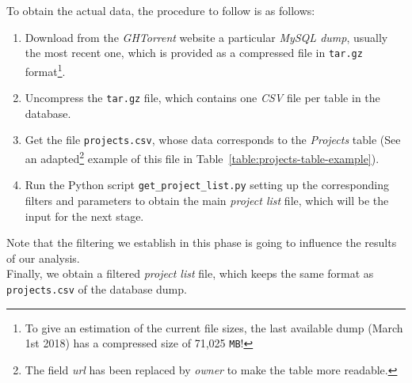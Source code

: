\documentclass[a4paper, 12pt]{book}
\begin{document}
To obtain the actual data, the procedure to follow is as follows:
\begin{enumerate}
  \item Download from the \emph{GHTorrent} website a particular \emph{MySQL dump}, usually the most recent one, which is provided as a compressed file in \texttt{tar.gz}
        format\footnote{To give an estimation of the current file sizes, the last available dump (March 1st 2018) has a compressed size of 71,025 \texttt{MB}!}.
  \item Uncompress the \texttt{tar.gz} file, which contains one \emph{CSV} file per table in the database.
  \item Get the file \texttt{projects.csv}, whose data corresponds to the \emph{Projects} table (See an adapted\footnote{The field \emph{url} has been replaced by \emph{owner} to make the table more readable.}
  example of this file in Table~\ref{table:projects-table-example}).
  \item Run the Python script \texttt{get\_project\_list.py} setting up the corresponding filters and parameters to obtain the main
        \emph{project list} file, which will be the input for the next stage.
\end{enumerate}

Note that the filtering we establish in this phase is going to influence the results of our analysis.\\
Finally, we obtain a filtered \emph{project list} file, which keeps the same format as \texttt{projects.csv} of the database dump.
\end{document}
